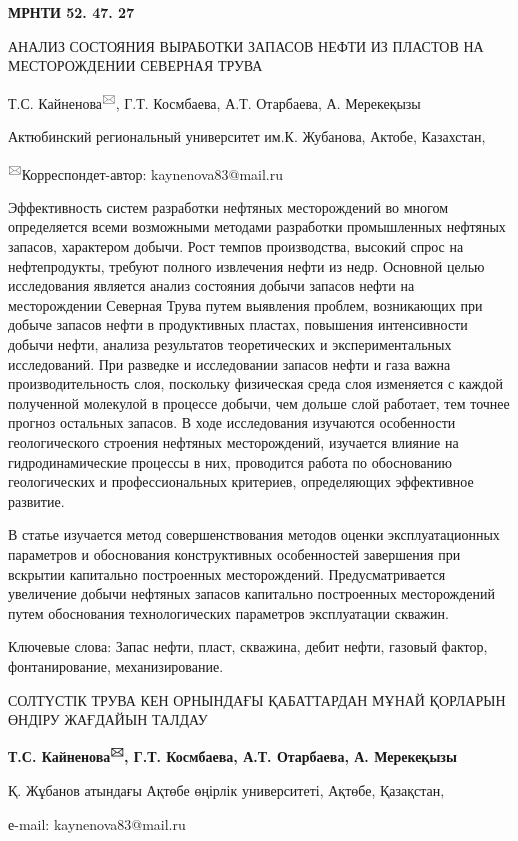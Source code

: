 

\newpage
{\bfseries МРНТИ 52. 47. 27}

АНАЛИЗ СОСТОЯНИЯ ВЫРАБОТКИ ЗАПАСОВ НЕФТИ ИЗ ПЛАСТОВ НА МЕСТОРОЖДЕНИИ
СЕВЕРНАЯ ТРУВА

Т.С. Кайненова\textsuperscript{🖂}, Г.Т. Космбаева, А.Т. Отарбаева, А.
Мерекеқызы

Актюбинский региональный университет им.К. Жубанова, Актобе, Казахстан,

\textsuperscript{🖂}Корреспондет-автор: kaynenova83@mail.ru

Эффективность систем разработки нефтяных месторождений во многом
определяется всеми возможными методами разработки промышленных нефтяных
запасов, характером добычи. Рост темпов производства, высокий спрос на
нефтепродукты, требуют полного извлечения нефти из недр. Основной целью
исследования является анализ состояния добычи запасов нефти на
месторождении Северная Трува путем выявления проблем, возникающих при
добыче запасов нефти в продуктивных пластах, повышения интенсивности
добычи нефти, анализа результатов теоретических и экспериментальных
исследований. При разведке и исследовании запасов нефти и газа важна
производительность слоя, поскольку физическая среда слоя изменяется с
каждой полученной молекулой в процессе добычи, чем дольше слой работает,
тем точнее прогноз остальных запасов. В ходе исследования изучаются
особенности геологического строения нефтяных месторождений, изучается
влияние на гидродинамические процессы в них, проводится работа по
обоснованию геологических и профессиональных критериев, определяющих
эффективное развитие.

В статье изучается метод совершенствования методов оценки
эксплуатационных параметров и обоснования конструктивных особенностей
завершения при вскрытии капитально построенных месторождений.
Предусматривается увеличение добычи нефтяных запасов капитально
построенных месторождений путем обоснования технологических параметров
эксплуатации скважин.

Ключевые слова: Запас нефти, пласт, скважина, дебит нефти, газовый
фактор, фонтанирование, механизирование.

СОЛТҮСТІК ТРУВА КЕН ОРНЫНДАҒЫ ҚАБАТТАРДАН МҰНАЙ ҚОРЛАРЫН ӨНДІРУ ЖАҒДАЙЫН
ТАЛДАУ

{\bfseries Т.С. Кайненова\textsuperscript{🖂}, Г.Т. Космбаева, А.Т.
Отарбаева, А. Мерекеқызы}

Қ. Жұбанов атындағы Ақтөбе өңірлік университеті, Ақтөбе, Қазақстан,

е-mail: kaynenova83@mail.ru

